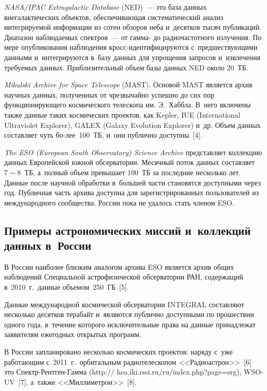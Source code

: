 \begin{multicols}{2}
  \textit{NASA/IPAC Extragalactic Database} (NED)~--- это база данных внегалактических 
объектов, обеспечивающая систематический анализ интегрируемой информации из сотен 
обзоров неба и~десятков тысяч публикаций. Диапазон наблюдаемых спект\-ров~--- от  
гамма- до радиочастотного излучения. По мере опубликования наблюдения 
кросс-иден\-ти\-фи\-ци\-ру\-ют\-ся с~предшествующими данными и~интегрируются в~базу 
данных для упрощения 
запросов и~извлечения требуемых данных. Приблизительный объем базы данных NED около 20~ТБ. 
  
  \textit{Mikulski Archive for Space Telescope} (MAST). Основой MAST является архив 
научных данных, полученных от чрезвычайно успешно до сих пор функционирующего 
космического телескопа им. Э.~Хаббла. В~него включены также данные таких 
космических проектов, как Kepler, IUE (International Ultraviolet Explorer), 
GALEX (Galaxy Evolution Explorer) и~др. Объем данных составляет чуть 
бо-\linebreak лее~100~ТБ, и~они публично доступны~[4]. 
  
  \textit{The ESO (European South Observatory) Science Archive} представляет коллекцию 
данных Европейской южной обсерватории. Месячный поток данных составляет 
$7\sim8$~ТБ, а~полный объем превышает 100~ТБ за последние несколько лет. Данные 
\mbox{после} научной обработки в~большей части становятся доступными через год. Публичная 
часть архива доступна для зарегистрированных пользователей из международного 
сообщества. России пока не удалось стать членом ESO.

\subsection{Примеры астрономических миссий и~коллекций данных в~России}

  В России наиболее близким аналогом архива ESO является архив общих наблюдений 
Специальной астрофизической обсерватории РАН, содержащий в~2010~г.\ данные 
объемом~250~ГБ~[5].
  
  Данные международной космической обсерватории INTEGRAL составляют несколько 
десятков терабайт и~являются публично доступными по про\-шест\-вии одного года, в~течение 
которого исключительные права на данные принадлежат заявителям ежегодных открытых 
программ. 
  
  В России запланировано несколько космических проектов: наряду с~уже работающим 
с~2011~г.\ орбитальным радиотелескопом <<Радиоастрон>>~[6] это  
Спектр-Рент\-ген-Гам\-ма ({\sf http:// hea.iki.rssi.ru/ru/index.php?page=srg}), WSO-UV~[7], 
а~также <<Миллиметрон>>~[8].


\end{multicols}
